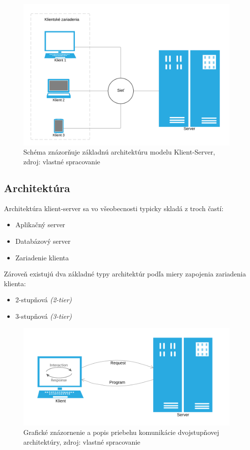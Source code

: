 \documentclass[
  printed, %
  table,   %
  lof,     %
  nolot,   %
  nocover
]{fithesis3}
\begin{document}
\begin{figure}[h]
  \centering
    \includegraphics[width=.94\textwidth]{images/C-S-basic.png}
  \caption{Schéma znázorňuje základnú architektúru modelu Klient-Server, zdroj:
  vlastné spracovanie}
  \label{fig:cs-basic}
\end{figure}

\subsection{Architektúra}
Architektúra klient-server sa vo všeobecnosti typicky skladá z troch 
častí:
\begin{itemize}
	\item Aplikačný server
	\item Databázový server
	\item Zariadenie klienta
\end{itemize}
Zároveň existujú dva základné typy architektúr podľa miery zapojenia zariadenia klienta: 
\begin{itemize}
	\item 2-stupňová \textit{(2-tier)}
	\item 3-stupňová \textit{(3-tier)}
\end{itemize}

\begin{figure}[t]
  \centering
    \includegraphics[width=.89\textwidth]{images/C-S-thick.png}
  \caption{Grafické znázornenie a popis priebehu komunikácie dvojstupňovej architektúry,
  zdroj: vlastné spracovanie}
  \label{fig:cs-thick}
\end{figure}
\end{document}
